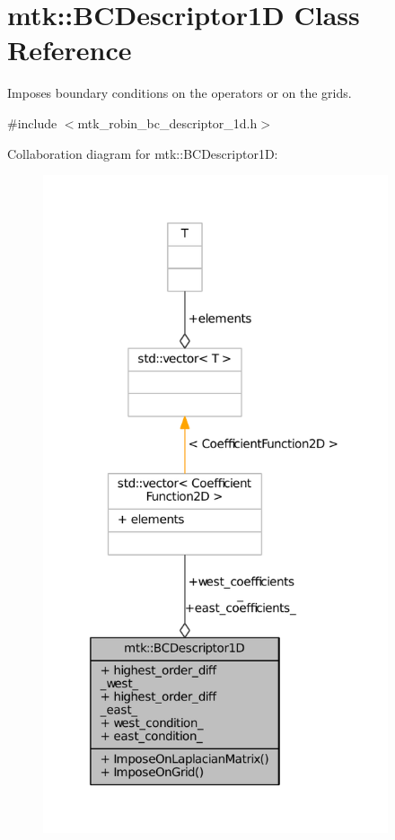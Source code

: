 \hypertarget{classmtk_1_1BCDescriptor1D}{\section{mtk\+:\+:B\+C\+Descriptor1\+D Class Reference}
\label{classmtk_1_1BCDescriptor1D}
}


Imposes boundary conditions on the operators or on the grids.  




{\ttfamily \#include $<$mtk\+\_\+robin\+\_\+bc\+\_\+descriptor\+\_\+1d.\+h$>$}



Collaboration diagram for mtk\+:\+:B\+C\+Descriptor1\+D\+:\nopagebreak
\begin{figure}[H]
\begin{center}
\leavevmode
\includegraphics[height=550pt]{classmtk_1_1BCDescriptor1D__coll__graph}
\end{center}
\end{figure}
